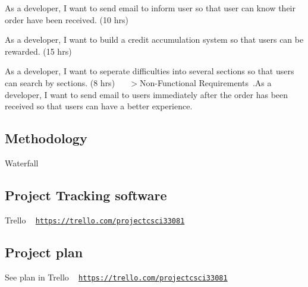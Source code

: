 \begin{DoxyEnumerate}
\item As a developer, I want to send email to inform user so that user can know their order have been received. (10 hrs)~\newline

\item As a developer, I want to build a credit accumulation system so that users can be rewarded. (15 hrs)~\newline

\item As a developer, I want to seperate difficulties into several sections so that users can search by sections. (8 hrs)~\newline
 ~\newline
 $>$Non-\/\+Functional Requirements~.\+As a developer, I want to send email to users immediately after the order has been received so that users can have a better experience.~\newline
 ~\newline

\end{DoxyEnumerate}

\subsection*{Methodology}

Waterfall~\newline
 \subsection*{Project Tracking software}

Trello ~\newline
 \href{https://trello.com/projectcsci33081}{\tt https\+://trello.\+com/projectcsci33081} ~\newline
 \subsection*{Project plan~\newline
}

See plan in Trello ~\newline
 \href{https://trello.com/projectcsci33081}{\tt https\+://trello.\+com/projectcsci33081} ~\newline
 